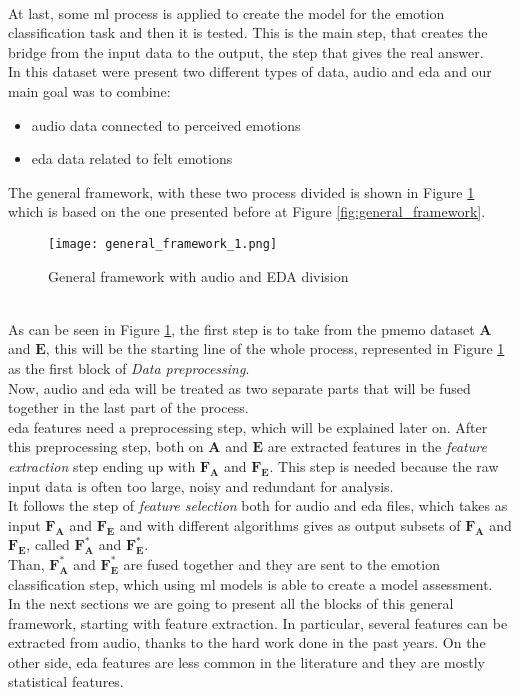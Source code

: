 \\
At last, some \gls{ml} process is applied to create the model for the emotion classification task and then it is tested. This is the main step, that creates the bridge from the input data to the output, the step that gives the real answer.
\\
In this dataset were present two different types of data, audio and \gls{eda} and our main goal was to combine:
\begin{itemize}
	\item audio data connected to perceived emotions
	\item \gls{eda} data related to felt emotions
\end{itemize}
The general framework, with these two process divided is shown in Figure \ref{fig:general_framework_1} which is based on the one presented before at Figure  \ref{fig:general_framework}.
\begin{figure}[h]
    \centering
    \texttt{[image: general\_framework\_1.png]} 
	\caption{General framework with audio and EDA division}
    \label{fig:general_framework_1}
\end{figure}
\\
As can be seen in Figure \ref{fig:general_framework_1}, the first step is to take from the \gls{pmemo} dataset $\textbf{A}$ and $\textbf{E}$, this will be the starting line of the whole process, represented in Figure \ref{fig:general_framework_1} as the first block of \textit{Data preprocessing}.
\\
Now, audio and \gls{eda} will be treated as two separate parts that will be fused together in the last part of the process.
\\
\gls{eda} features need a preprocessing step, which will be explained later on. After this preprocessing step, both on $\textbf{A}$ and $\textbf{E}$ are extracted features in the \textit{feature extraction} step ending up with $\textbf{F}_\textbf{A}$ and $\textbf{F}_\textbf{E}$. This step is needed because the raw input data is often too large, noisy and redundant for analysis.
\\
It follows the step of \textit{feature selection} both for audio and \gls{eda} files, which takes as input $\textbf{F}_\textbf{A}$ and $\textbf{F}_\textbf{E}$ and with different algorithms gives as output subsets of $\textbf{F}_\textbf{A}$ and $\textbf{F}_\textbf{E}$, called $\textbf{F}_\textbf{A}^*$ and $\textbf{F}_\textbf{E}^*$.
\\
Than, $\textbf{F}_\textbf{A}^*$ and $\textbf{F}_\textbf{E}^*$ are fused together and they are sent to the emotion classification step, which using \gls{ml} models is able to create a model assessment.
\\ \indent
In the next sections we are going to present all the blocks of this general framework, starting with feature extraction. In particular, several features can be extracted from audio, thanks to the hard work done in the past years. On the other side, \gls{eda} features are less common in the literature and they are mostly statistical features.

